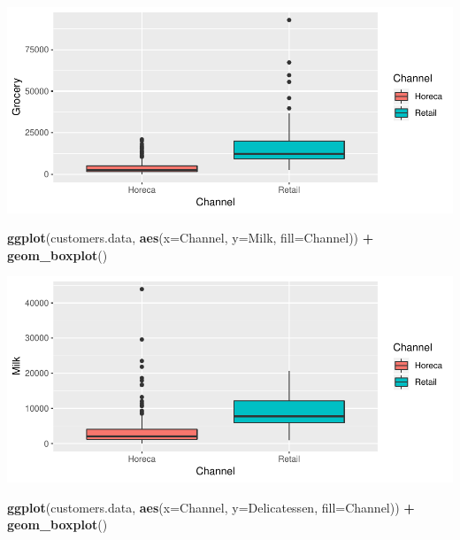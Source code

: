 \documentclass[]{article}
\newenvironment{Shaded}{\begin{snugshade}}{\end{snugshade}}
\newcommand{\KeywordTok}[1]{\textcolor[rgb]{0.13,0.29,0.53}{\textbf{#1}}}
\newcommand{\DataTypeTok}[1]{\textcolor[rgb]{0.13,0.29,0.53}{#1}}
\newcommand{\StringTok}[1]{\textcolor[rgb]{0.31,0.60,0.02}{#1}}
\newcommand{\OperatorTok}[1]{\textcolor[rgb]{0.81,0.36,0.00}{\textbf{#1}}}
\newcommand{\NormalTok}[1]{#1}
\begin{document}
\begin{center}\includegraphics{7._K-means_Clustering_files/figure-latex/unnamed-chunk-8-1} \end{center}

\begin{Shaded}
\begin{Highlighting}[]
\KeywordTok{ggplot}\NormalTok{(customers.data, }\KeywordTok{aes}\NormalTok{(}\DataTypeTok{x=}\NormalTok{Channel, }\DataTypeTok{y=}\NormalTok{Milk, }\DataTypeTok{fill=}\NormalTok{Channel)) }\OperatorTok{+}\StringTok{ }\KeywordTok{geom_boxplot}\NormalTok{()}
\end{Highlighting}
\end{Shaded}

\begin{center}\includegraphics{7._K-means_Clustering_files/figure-latex/unnamed-chunk-8-2} \end{center}

\begin{Shaded}
\begin{Highlighting}[]
\KeywordTok{ggplot}\NormalTok{(customers.data, }\KeywordTok{aes}\NormalTok{(}\DataTypeTok{x=}\NormalTok{Channel, }\DataTypeTok{y=}\NormalTok{Delicatessen, }\DataTypeTok{fill=}\NormalTok{Channel)) }\OperatorTok{+}\StringTok{ }\KeywordTok{geom_boxplot}\NormalTok{()}
\end{Highlighting}
\end{Shaded}
\end{document}
